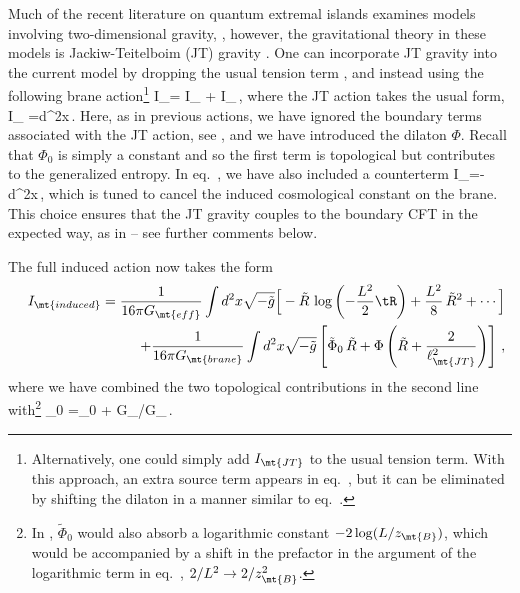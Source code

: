 Much of the recent literature on quantum extremal islands examines models involving two-dimensional gravity, \eg \cite{Almheiri:2019psf, Almheiri:2019hni, Almheiri:2019yqk, Chen:2019uhq, Penington:2019kki, Almheiri:2019qdq, Chen:2019iro}, however, the gravitational theory in these models is Jackiw-Teitelboim (JT) gravity \cite{Jackiw:1984je,Teitelboim:1983ux}. One can incorporate JT gravity into the current model by dropping the usual tension term , and instead using the following brane action\footnote{Alternatively, one could simply add $I_\mt{JT}$ to the usual tension term. With this approach, an extra source term appears in eq.~, but it can be eliminated by shifting the dilaton in a manner similar to eq.~.} 
\beq\label{braneact2}
I_= I_ + I_\,,
\eeq
where the JT action takes the usual form,
\beq\label{JTee}
I_ =\int d^2x\,.
\eeq
Here, as in previous actions, we have ignored the boundary terms associated with the JT action, \eg see \cite{Maldacena:2016upp}, and we have introduced the dilaton $\Phi$. Recall that $\Phi_0$ is simply a constant and so the first term is topological but contributes to the generalized entropy. In eq.~, we have also included a counterterm 
\beq\label{count123}
I_=-\int d^2x\,,
\eeq
which is tuned to cancel the induced cosmological constant on the brane. This choice ensures that the JT gravity  couples to the boundary CFT in the expected way, \eg as in  \cite{Almheiri:2019psf,Maldacena:2016upp} -- see further comments below.

The full induced action now takes the form
\begin{align}
&&I_\mt{induced}=\frac{1}{16 \pi G_\mt{eff}}\int d^2x\sqrt{-\tilde{g}} \Big[ -  \tilde{R} \,\log\left(-\frac{L^2 }{2}\tR\right) +\frac{L^2}{8}\,\tilde{R}^2 +\cdots\Big]
\nonumber\\
&&\qquad+\frac{1}{16\pi G_\mt{brane}}\int d^2x\sqrt{-\tilde{g}}\left[\tilde\Phi_0\,\tilde{R}+ \Phi\left(\tilde{R}+\frac{2}{\ell^2_\mt{JT}}
\right)\right]\,,
\label{fullindyact}
\end{align}
where we have combined the two topological contributions in the second line with\footnote{In \cite{Almheiri:2019psf}, $\tilde \Phi_0$ would also absorb a logarithmic constant $-2\log(L/z_\mt{B})$, which would be accompanied by a shift in the prefactor in the argument of the logarithmic term in eq.~, \ie $2/L^2\to2/ z^2_\mt{B}$.}
\beq\label{shift0}
\tilde \Phi_0 =\Phi_0 + G_/G_\,.
\eeq

